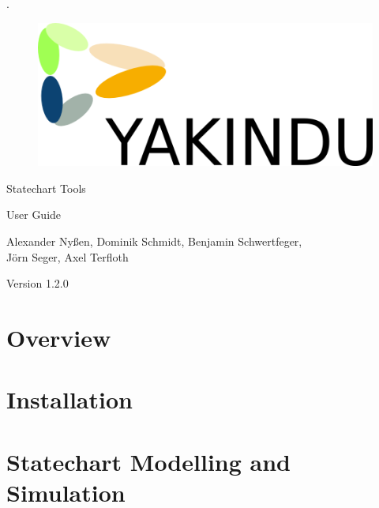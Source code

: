 \documentclass[12pt,ngerman, a4paper]{book}
\begin{document}
\setlength\headheight{0.6in}

.
\vspace{2cm}

\begin{center}
\begin{figure}[h!]
\centering
\includegraphics{Pictures/yakinduLogoBig}
\end{figure}

\vspace{2cm}

\Huge{Statechart Tools}

\Huge{User Guide}

\vspace{1cm}

\large{Alexander Nyßen, Dominik Schmidt, Benjamin Schwertfeger, \\J\"orn Seger,
Axel Terfloth}

Version 1.2.0
\end{center}


\tableofcontents

\clearpage
\chapter{Overview}

%

\chapter{Installation}


\chapter{Statechart Modelling and Simulation}

\end{document}
